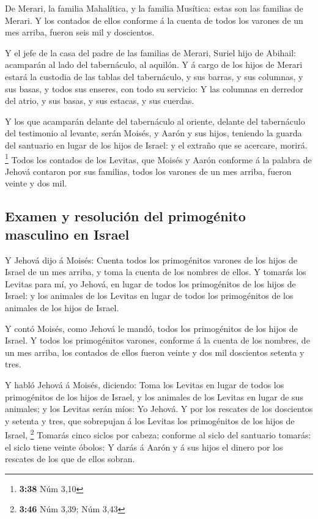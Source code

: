  De Merari, la familia Mahalítica, y la familia Musítica:
estas son las familias de Merari.  Y los contados de
ellos conforme á la cuenta de todos los varones de un mes arriba, fueron
seis mil y doscientos.

 Y el jefe de la casa del padre de las familias de
Merari, Suriel hijo de Abihail: acamparán al lado del tabernáculo, al
aquilón.  Y á cargo de los hijos de Merari estará la
custodia de las tablas del tabernáculo, y sus barras, y sus columnas, y
sus basas, y todos sus enseres, con todo su servicio:  Y
las columnas en derredor del atrio, y sus basas, y sus estacas, y sus
cuerdas.

 Y los que acamparán delante del tabernáculo al oriente,
delante del tabernáculo del testimonio al levante, serán Moisés, y Aarón
y sus hijos, teniendo la guarda del santuario en lugar de los hijos de
Israel: y el extraño que se acercare, morirá. \footnote{\textbf{3:38}
  Núm 3,10}  Todos los contados de los Levitas, que
Moisés y Aarón conforme á la palabra de Jehová contaron por sus
familias, todos los varones de un mes arriba, fueron veinte y dos mil.

\hypertarget{examen-y-resoluciuxf3n-del-primoguxe9nito-masculino-en-israel}{%
\subsection{Examen y resolución del primogénito masculino en
Israel}\label{examen-y-resoluciuxf3n-del-primoguxe9nito-masculino-en-israel}}

 Y Jehová dijo á Moisés: Cuenta todos los primogénitos
varones de los hijos de Israel de un mes arriba, y toma la cuenta de los
nombres de ellos.  Y tomarás los Levitas para mí, yo
Jehová, en lugar de todos los primogénitos de los hijos de Israel: y los
animales de los Levitas en lugar de todos los primogénitos de los
animales de los hijos de Israel.

 Y contó Moisés, como Jehová le mandó, todos los
primogénitos de los hijos de Israel.  Y todos los
primogénitos varones, conforme á la cuenta de los nombres, de un mes
arriba, los contados de ellos fueron veinte y dos mil doscientos setenta
y tres.

 Y habló Jehová á Moisés, diciendo:  Toma
los Levitas en lugar de todos los primogénitos de los hijos de Israel, y
los animales de los Levitas en lugar de sus animales; y los Levitas
serán míos: Yo Jehová.  Y por los rescates de los
doscientos y setenta y tres, que sobrepujan á los Levitas los
primogénitos de los hijos de Israel, \footnote{\textbf{3:46} Núm 3,39;
  Núm 3,43}  Tomarás cinco siclos por cabeza; conforme al
siclo del santuario tomarás: el siclo tiene veinte óbolos:
 Y darás á Aarón y á sus hijos el dinero por los rescates
de los que de ellos sobran.

